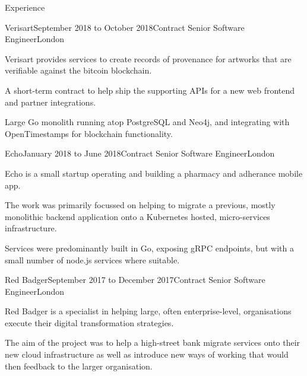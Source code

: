 \documentclass{resume} %
\begin{document}

\begin{rSection}{Experience}

  \begin{rExperience}{Verisart}{September 2018 to October 2018}{Contract Senior Software Engineer}{London}
  \item Verisart provides services to create records of provenance for artworks that are verifiable against the bitcoin blockchain.
  \item A short-term contract to help ship the supporting APIs for a new web frontend and partner integrations.
  \item Large Go monolith running atop PostgreSQL and Neo4j, and integrating with OpenTimestamps for blockchain functionality.
  \end{rExperience}


  \begin{rExperience}{Echo}{January 2018 to June 2018}{Contract Senior Software Engineer}{London}
  \item Echo is a small startup operating and building a pharmacy and adherance mobile app.
  \item The work was primarily focussed on helping to migrate a previous, mostly monolithic backend application onto a Kubernetes hosted, micro-services infrastructure.
  \item Services were predominantly built in Go, exposing gRPC endpoints, but with a small number of node.js services where suitable.
  \end{rExperience}


  \begin{rExperience}{Red Badger}{September 2017 to December 2017}{Contract Senior Software Engineer}{London}
  \item Red Badger is a specialist in helping large, often enterprise-level, organisations execute their digital transformation strategies.
  \item The aim of the project was to help a high-street bank migrate services onto their new cloud infrastructure as well as introduce new ways of working that would then feedback to the larger organisation.
  \end{rExperience}


\end{rSection}
\end{document}
